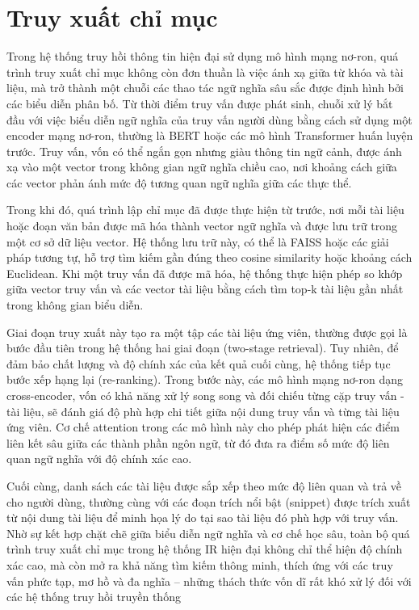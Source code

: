 \section{Truy xuất chỉ mục}
Trong hệ thống truy hồi thông tin hiện đại sử dụng mô hình mạng nơ-ron, quá trình truy xuất chỉ mục không còn đơn thuần là việc ánh xạ giữa từ khóa và tài liệu, mà trở thành một chuỗi các thao tác ngữ nghĩa sâu sắc được định hình bởi các biểu diễn phân bố. Từ thời điểm truy vấn được phát sinh, chuỗi xử lý bắt đầu với việc biểu diễn ngữ nghĩa của truy vấn người dùng bằng cách sử dụng một encoder mạng nơ-ron, thường là BERT hoặc các mô hình Transformer huấn luyện trước. Truy vấn, vốn có thể ngắn gọn nhưng giàu thông tin ngữ cảnh, được ánh xạ vào một vector trong không gian ngữ nghĩa chiều cao, nơi khoảng cách giữa các vector phản ánh mức độ tương quan ngữ nghĩa giữa các thực thể.

Trong khi đó, quá trình lập chỉ mục đã được thực hiện từ trước, nơi mỗi tài liệu hoặc đoạn văn bản được mã hóa thành vector ngữ nghĩa và được lưu trữ trong một cơ sở dữ liệu vector. Hệ thống lưu trữ này, có thể là FAISS hoặc các giải pháp tương tự, hỗ trợ tìm kiếm gần đúng theo cosine similarity hoặc khoảng cách Euclidean. Khi một truy vấn đã được mã hóa, hệ thống thực hiện phép so khớp giữa vector truy vấn và các vector tài liệu bằng cách tìm top-k tài liệu gần nhất trong không gian biểu diễn.

Giai đoạn truy xuất này tạo ra một tập các tài liệu ứng viên, thường được gọi là bước đầu tiên trong hệ thống hai giai đoạn (two-stage retrieval). Tuy nhiên, để đảm bảo chất lượng và độ chính xác của kết quả cuối cùng, hệ thống tiếp tục bước xếp hạng lại (re-ranking). Trong bước này, các mô hình mạng nơ-ron dạng cross-encoder, vốn có khả năng xử lý song song và đối chiếu từng cặp truy vấn - tài liệu, sẽ đánh giá độ phù hợp chi tiết giữa nội dung truy vấn và từng tài liệu ứng viên. Cơ chế attention trong các mô hình này cho phép phát hiện các điểm liên kết sâu giữa các thành phần ngôn ngữ, từ đó đưa ra điểm số mức độ liên quan ngữ nghĩa với độ chính xác cao.

Cuối cùng, danh sách các tài liệu được sắp xếp theo mức độ liên quan và trả về cho người dùng, thường cùng với các đoạn trích nổi bật (snippet) được trích xuất từ nội dung tài liệu để minh họa lý do tại sao tài liệu đó phù hợp với truy vấn. Nhờ sự kết hợp chặt chẽ giữa biểu diễn ngữ nghĩa và cơ chế học sâu, toàn bộ quá trình truy xuất chỉ mục trong hệ thống IR hiện đại không chỉ thể hiện độ chính xác cao, mà còn mở ra khả năng tìm kiếm thông minh, thích ứng với các truy vấn phức tạp, mơ hồ và đa nghĩa -- những thách thức vốn dĩ rất khó xử lý đối với các hệ thống truy hồi truyền thống
